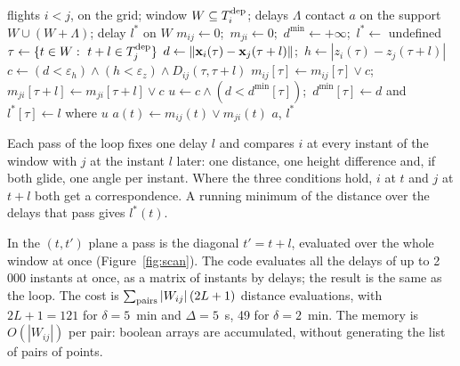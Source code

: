 \begin{algorithm}[htbp]
\caption{Phase 2: scan of one candidate pair}\label{alg:scan}
\begin{algorithmic}[1]
\Require flights $i<j$, on the grid; window $W\subseteq T^{\mathrm{dep}}_i$; delays $\Lambda$
\Ensure contact $a$ on the support $W\cup(W+\Lambda)$; delay $l^*$ on $W$
\State $m_{ij}\gets0$;\ $m_{ji}\gets0$;\ $d^{\min}\gets+\infty$;\ $l^*\gets$ undefined
  \State $\tau\gets\{t\in W:\ t+l\in T^{\mathrm{dep}}_j\}$ 
  \State $d\gets\|\mathbf{x}_i(\tau)-\mathbf{x}_j(\tau+l)\|$;\ $h\gets|z_i(\tau)-z_j(\tau+l)|$
  \State $c\gets(d<\varepsilon_h)\wedge(h<\varepsilon_z)\wedge D_{ij}(\tau,\tau+l)$
  \State $m_{ij}[\tau]\gets m_{ij}[\tau]\vee c$;\ $m_{ji}[\tau+l]\gets m_{ji}[\tau+l]\vee c$
  \State $u\gets c\wedge(d<d^{\min}[\tau])$;\ $d^{\min}[\tau]\gets d$ and $l^*[\tau]\gets l$ where $u$
\EndFor
\State $a(t)\gets m_{ij}(t)\vee m_{ji}(t)$
\State \Return $a$, $l^*$
\end{algorithmic}
\end{algorithm}

\begin{inwords}
Each pass of the loop fixes one delay $l$ and compares $i$ at every instant of the window with
$j$ at the instant $l$ later: one distance, one height difference and, if both glide, one angle per
instant. Where the three conditions hold, $i$ at $t$ and $j$ at $t+l$ both get a correspondence. A
running minimum of the distance over the delays that pass gives $l^*(t)$.
\end{inwords}

In the $(t,t')$ plane a pass is the diagonal $t'=t+l$, evaluated over the whole window at once
(Figure~\ref{fig:scan}). The code evaluates all the delays of up to 2\,000 instants at once, as a
matrix of instants by delays; the result is the same as the loop. The cost is
$\sum_{\rm pairs}|W_{ij}|\,(2L+1)$ distance evaluations, with $2L+1=121$ for $\delta=5$~min and
$\Delta=5$~s, 49 for $\delta=2$~min. The memory is $O(|W_{ij}|)$ per pair: boolean arrays are
accumulated, without generating the list of pairs of points.

